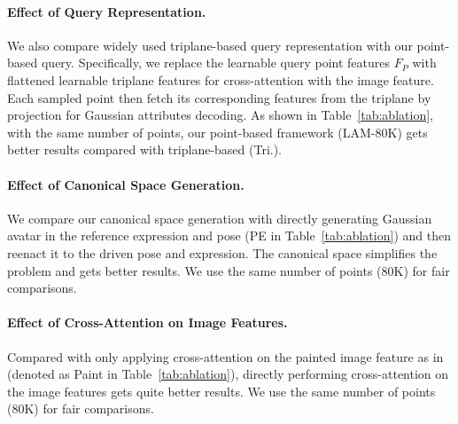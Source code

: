 \paragraph{\textbf{Effect of Query Representation.}}
We also compare widely used triplane-based query representation with our point-based query. Specifically, we replace the learnable query point features $F_P$ with flattened learnable triplane features for cross-attention with the image feature. Each sampled point then fetch its corresponding features from the triplane by projection for Gaussian attributes decoding. As shown in Table~\ref{tab:ablation}, with the same number of points, our point-based framework (LAM-80K) gets better results compared with triplane-based (Tri.).  

\paragraph{\textbf{Effect of Canonical Space Generation.}} We compare our canonical space generation with directly generating Gaussian avatar in the reference expression and pose (PE in Table~\ref{tab:ablation}) and then reenact it to the driven pose and expression. The canonical space simplifies the problem and gets better results. We use the same number of points (80K) for fair comparisons.

\paragraph{\textbf{Effect of Cross-Attention on Image Features.}} Compared with only applying cross-attention on the painted image feature as in~\cite{transhuman} (denoted as Paint in Table~\ref{tab:ablation}), directly performing cross-attention on the image features gets quite better results. We use the same number of points (80K) for fair comparisons.